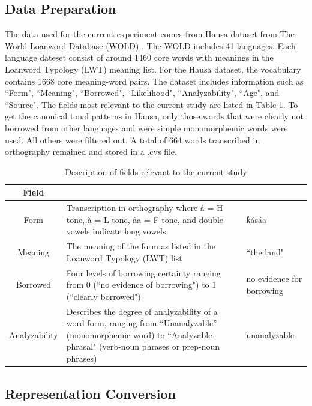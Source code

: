 \documentclass[11pt,letterpaper]{article}
\begin{document}
\subsection{Data Preparation}
The data used for the current experiment comes from Hausa dataset \citep{wold-4} from The World Loanword Database (WOLD) \citep{wold}. The WOLD includes 41 languages. Each language dateset consist of around 1460 core words with meanings in the Loanword Typology (LWT) meaning list.  For the Hausa dataset, the vocabulary contains 1668 core meaning-word pairs. The dataset includes information such as ``Form", ``Meaning", ``Borrowed", ``Likelihood", ``Analyzability", ``Age", and ``Source". The fields most relevant to the current study are listed in Table \ref{tab:fields}. To get the canonical tonal patterns in Hausa, only those words that were clearly not borrowed from other languages and were simple monomorphemic words were used. All others were filtered out. A total of 664 words transcribed in orthography remained and stored in a .cvs file.


\begin{table}[H]
	\centering
	\begin{tabular}{c|>{\arraybackslash}m{}|>{\arraybackslash}m{}}
		\hline
		\multicolumn{1}{c|}{\textbf{Field}} & \multicolumn{1}{c|}{\textbf{Explanation}} & \multicolumn{1}{c}{\textbf{Example}}  \\
		\hline
		Form  & Transcription in orthography where á = H tone, à = L tone, âa = F tone, and double vowels indicate long vowels  &  ƙásáa \\
		\hline
		Meaning & The meaning of the form as listed in the Loanword Typology (LWT) list & ``the land" \\
		\hline
		Borrowed & Four levels of borrowing certainty ranging from 0 (``no evidence of borrowing") to 1 (``clearly borrowed") & no evidence for borrowing\\
		\hline
		Analyzability & Describes the degree of analyzability of a word form, ranging from ``Unanalyzable'' (monomorphemic word) to ``Analyzable phrasal" (verb-noun phrases or prep-noun phrases) & unanalyzable\\
		\hline
	\end{tabular}
	\caption{Description of fields relevant to the current study}
	\label{tab:fields}
\end{table}


\subsection{Representation Conversion}
\end{document}

